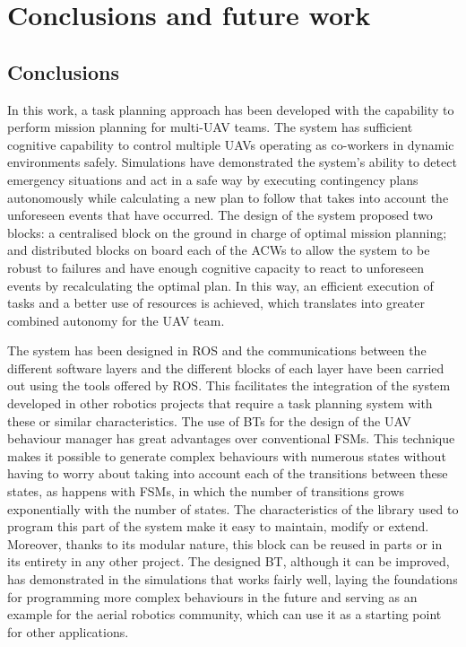 \chapter{Conclusions and future work}
\label{ch:ConclusionsAndFutureWork}

\section{Conclusions}
\label{sec:Conclusions}
In this work, a task planning approach has been developed with the capability to perform mission planning for multi-\gls{UAV} teams. The system has sufficient cognitive capability to control multiple \glspl{UAV} operating as co-workers in dynamic environments safely. Simulations have demonstrated the system's ability to detect emergency situations and act in a safe way by executing contingency plans autonomously while calculating a new plan to follow that takes into account the unforeseen events that have occurred. The design of the system proposed two blocks: a centralised block on the ground in charge of optimal mission planning; and distributed blocks on board each of the \glspl{ACW} to allow the system to be robust to failures and have enough cognitive capacity to react to unforeseen events by recalculating the optimal plan. In this way, an efficient execution of tasks and a better use of resources is achieved, which translates into greater combined autonomy for the \gls{UAV} team.

The system has been designed in \gls{ROS} and the communications between the different software layers and the different blocks of each layer have been carried out using the tools offered by \gls{ROS}. This facilitates the integration of the system developed in other robotics projects that require a task planning system with these or similar characteristics. The use of \glspl{BT} for the design of the \gls{UAV} behaviour manager has great advantages over conventional \glspl{FSM}. This technique makes it possible to generate complex behaviours with numerous states without having to worry about taking into account each of the transitions between these states, as happens with \glspl{FSM}, in which the number of transitions grows exponentially with the number of states. The characteristics of the library used to program this part of the system make it easy to maintain, modify or extend. Moreover, thanks to its modular nature, this block can be reused in parts or in its entirety in any other project. The designed \gls{BT}, although it can be improved, has demonstrated in the simulations that works fairly well, laying the foundations for programming more complex behaviours in the future and serving as an example for the aerial robotics community, which can use it as a starting point for other applications. 

